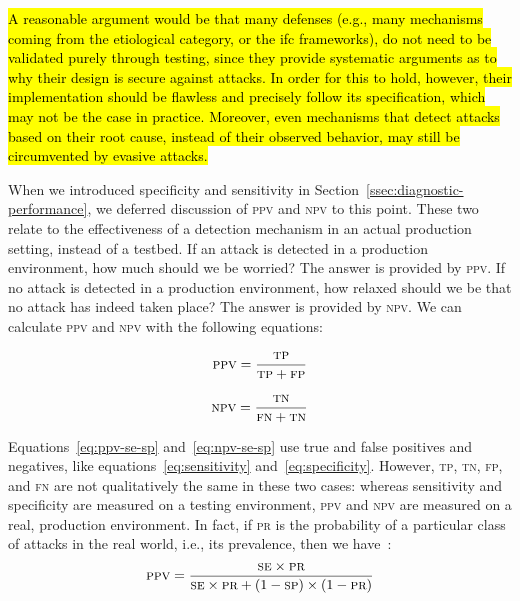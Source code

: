 \documentclass[10pt,journal,compsoc]{IEEEtran}
\newcommand{\hlc}[2][yellow]{ {\sethlcolor{#1} \hl{#2}} }
\begin{document}
\hlc[yellow]{A reasonable argument would be that many defenses
(e.g., many mechanisms coming from the etiological category,
or the {\sc ifc} frameworks), do not need to be
validated purely through testing, since they provide systematic
arguments as to why their design is secure against attacks.
In order for this to hold,
however, their implementation should be flawless
and precisely follow its specification, which may not
be the case in practice. Moreover, even mechanisms that detect attacks
based on their root cause, instead of their observed behavior, may still be
circumvented by evasive attacks.}

When we introduced specificity and sensitivity in
Section~\ref{ssec:diagnostic-performance}, we deferred discussion of
\textsc{ppv} and \textsc{npv} to this point. These two relate to the
effectiveness of a detection mechanism in an actual production setting,
instead of a testbed. If an attack is detected in a production
environment, how much should we be worried? The answer is provided by
\textsc{ppv}. If no attack is detected in a production environment,
how relaxed should we be that no attack has indeed taken place? The
answer is provided by \textsc{npv}. We can calculate \textsc{ppv} and
\textsc{npv} with the following equations:

\vspace{0.5mm}
\noindent\begin{minipage}{0.5\linewidth}
\begin{equation}
\textsc{ppv} = \frac{\textsc{tp}}{\textsc{tp} + \textsc{fp}}
\end{equation}
\end{minipage}
\begin{minipage}{0.5\linewidth}
\begin{equation}
\textsc{npv} = \frac{\textsc{tn}}{\textsc{fn} + \textsc{tn}}
\end{equation}
\end{minipage}\par\vspace{\belowdisplayskip}

\noindent
Equations~\ref{eq:ppv-se-sp} and~\ref{eq:npv-se-sp} use true and false
positives and negatives, like equations~\ref{eq:sensitivity}
and~\ref{eq:specificity}. However, \textsc{tp}, \textsc{tn},
\textsc{fp}, and \textsc{fn} are not qualitatively the same in these two cases:
whereas sensitivity and specificity are measured on a testing
environment, \textsc{ppv} and \textsc{npv} are measured on a real,
production environment. In fact, if \textsc{pr} is the probability of
a particular class of attacks in the real world,
i.e., its prevalence, then we
have~\cite{linn2004}:
\vspace{-1mm}
\begin{equation}
\textsc{ppv} = \frac{\textsc{se}\times \textsc{pr}}{
\textsc{se}\times \textsc{pr} + (1 - \textsc{sp})\times (1 -
\textsc{pr})}
\label{eq:ppv-se-sp}
\end{equation}
\end{document}
